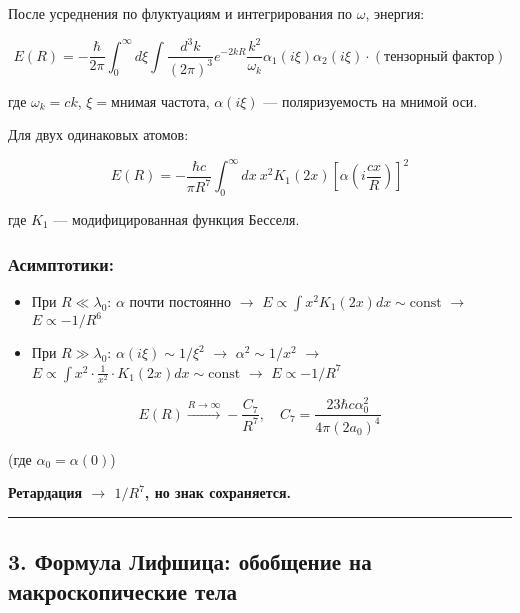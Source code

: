 \documentclass[11pt]{article}
\providecommand{\tightlist}{%
      \setlength{\itemsep}{0pt}\setlength{\parskip}{0pt}}
\begin{document}
После усреднения по флуктуациям и интегрирования по \(\omega\), энергия:

\[
E(R) = -\frac{\hbar}{2\pi} \int_0^\infty d\xi \int \frac{d^3k}{(2\pi)^3} e^{-2kR} \frac{k^2}{\omega_k} \alpha_1(i\xi) \alpha_2(i\xi) \cdot (\text{тензорный фактор})
\]

где \(\omega_k = c k\), \(\xi = \text{мнимая частота}\),
\(\alpha(i\xi)\) --- поляризуемость на мнимой оси.

Для двух одинаковых атомов:

\[
E(R) = -\frac{\hbar c}{\pi R^7} \int_0^\infty dx\ x^2 K_1(2x) \left[ \alpha\left(i \frac{c x}{R}\right) \right]^2
\]

где \(K_1\) --- модифицированная функция Бесселя.

\subsubsection{Асимптотики:}\label{ux430ux441ux438ux43cux43fux442ux43eux442ux438ux43aux438}

\begin{itemize}
\tightlist
\item
  При \(R \ll \lambda_0\): \(\alpha\) почти постоянно $\rightarrow$
  \(E \propto \int x^2 K_1(2x) dx \sim \text{const}\) $\rightarrow$
  \(E \propto -1/R^6\)
\item
  При \(R \gg \lambda_0\): \(\alpha(i\xi) \sim 1/\xi^2\) $\rightarrow$
  \(\alpha^2 \sim 1/x^2\) $\rightarrow$
  \(E \propto \int x^2 \cdot \frac{1}{x^2} \cdot K_1(2x) dx \sim \text{const}\)
  $\rightarrow$ \(E \propto -1/R^7\)
\end{itemize}

\[
\boxed{E(R) \xrightarrow{R \to \infty} -\frac{C_7}{R^7}, \quad C_7 = \frac{23 \hbar c \alpha_0^2}{4\pi (2a_0)^4}}
\]

(где \(\alpha_0 = \alpha(0)\))

\textbf{Ретардация $\rightarrow$ \(1/R^7\), но знак сохраняется.}

\begin{center}\rule{0.5\linewidth}{\linethickness}\end{center}

\subsection{3. Формула Лифшица: обобщение на макроскопические
тела}\label{ux444ux43eux440ux43cux443ux43bux430-ux43bux438ux444ux448ux438ux446ux430-ux43eux431ux43eux431ux449ux435ux43dux438ux435-ux43dux430-ux43cux430ux43aux440ux43eux441ux43aux43eux43fux438ux447ux435ux441ux43aux438ux435-ux442ux435ux43bux430}
\end{document}
